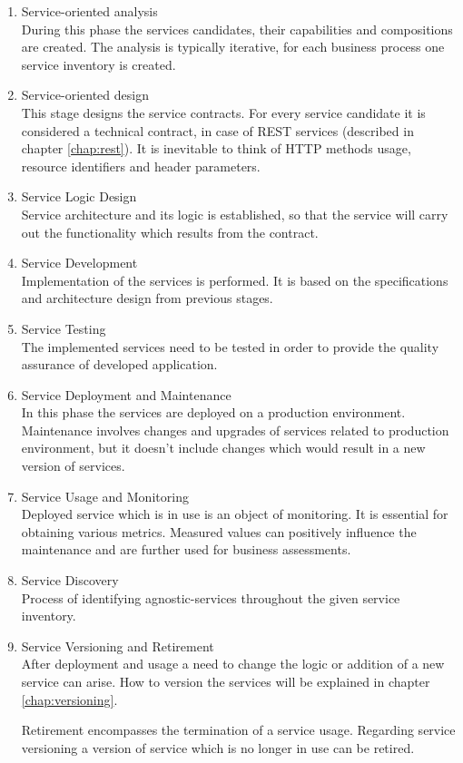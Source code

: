 \begin{enumerate}
  \item Service-oriented analysis \\
  During this phase the services candidates, their capabilities and compositions are created. The analysis is typically iterative, for each business process one service inventory is created.
  \item Service-oriented design \\
  This stage designs the service contracts. For every service candidate it is considered a technical contract, in case of REST services (described in chapter \ref{chap:rest}). It is inevitable to think of HTTP methods usage, resource identifiers and header parameters.
  \item Service Logic Design \\
  Service architecture and its logic is established, so that the service will carry out the functionality which results from the contract.
  \item Service Development \\
  Implementation of the services is performed. It is based on the specifications and architecture design from previous stages.
  \item Service Testing \\
  The implemented services need to be tested in order to provide the quality assurance of developed application.
  \item Service Deployment and Maintenance \\
  In this phase the services are deployed on a production environment. Maintenance involves changes and upgrades of services related to production environment, but it doesn't include changes which would result in a new version of services.
  \item Service Usage and Monitoring \\
  Deployed service which is in use is an object of monitoring. It is essential for obtaining various metrics. Measured values can positively influence the maintenance and are further used for business assessments.
  \item Service Discovery \\
  Process of identifying \gls{agnostic-services} throughout the given service inventory.
  \item Service Versioning and Retirement \\
  After deployment and usage a need to change the logic or addition of a new service can arise. How to version the services will be explained in chapter \ref{chap:versioning}. 
  
  Retirement encompasses the termination of a service usage. Regarding service versioning a version of service which is no longer in use can be retired.
\end{enumerate}


